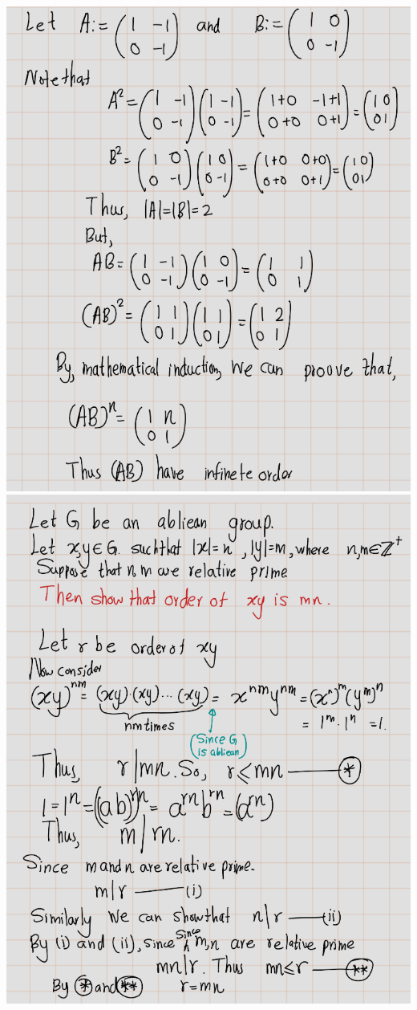 \documentclass[
]{book}
\theoremstyle{definition}
\theoremstyle{definition}
\theoremstyle{definition}
\theoremstyle{definition}
\theoremstyle{remark}
\begin{document}
\includegraphics{figures/ch_2/fig71.png}
\includegraphics{figures/ch_2/fig72.png}
\end{document}
